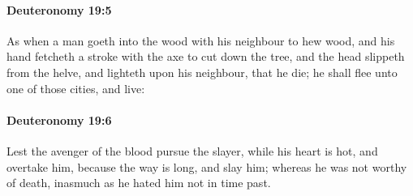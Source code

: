		\paragraph{Deuteronomy 19:5} %
			\label{DEUTERONOMY-19-5}

			As when a man goeth into the wood with his neighbour to hew wood, and his hand fetcheth a stroke with the axe to cut down the tree, and the head slippeth from the helve, and lighteth upon his neighbour, that he die; he shall flee unto one of those cities, and live:


		\paragraph{Deuteronomy 19:6} %
			\label{DEUTERONOMY-19-6}

			Lest the avenger of the blood pursue the slayer, while his heart is hot, and overtake him, because the way is long, and slay him; whereas he was not worthy of death, inasmuch as he hated him not in time past.


